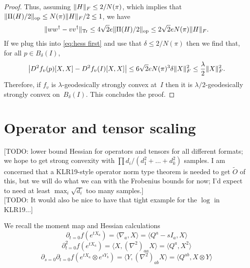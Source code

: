 \documentclass{article}
\DeclareMathOperator{\ope}{op}
\DeclarePairedDelimiter{\abs}{\lvert}{\rvert}
\DeclarePairedDelimiter{\norm}{\lVert}{\rVert}
\newcommand\tr{\operatorname{Tr}}
\newcommand{\TODO}[1]{{\color{blue}[TODO: #1]}}
\begin{document}
\begin{proof}
Thus, assuming $\norm{H}_F \leq 2 / N(\pi)$, which implies that $\norm{\Pi(H)/2}_{\ope} \leq N(\pi) \norm{H}_F / 2 \leq 1$, we have
\begin{align*}
  \norm{ww^\dagger - vv^\dagger}_{\tr}
\leq 4 \sqrt2 e \norm{\Pi(H)/2}_{\ope}
\leq 2 \sqrt2 e N(\pi) \norm{H}_F.
\end{align*}
If we plug this into \cref{eq:hess first} and use that $\delta \leq 2/N(\pi)$ then we find that, for all $p \in B_\delta(I)$,
\begin{align*}
  \abs[\big]{D^2f_v(p)[X,X] - D^2f_v(I)[X,X]}
\leq 6\sqrt{2} e N(\pi)^3 \delta \norm{X}_F^2
\leq \frac\lambda2 \norm{X}_F^2.
\end{align*}
Therefore, if $f_v$ is $\lambda$-geodesically strongly convex at~$I$ then it is $\lambda/2$-geodesically strongly convex on~$B_\delta(I)$.
This concludes the proof.
\end{proof}




\section{Operator and tensor scaling}\label{sec:scaling}
\TODO{lower bound Hessian for operators and tensors for all different formats; we hope to get strong convexity with $\prod d_i /(d_1^2 + \dots + d_k^2)$ samples. I am concerned that a KLR19-style operator norm type theorem is needed to get $\tilde{O}$ of this, but we will do what we can with the Frobenius bounds for now; I'd expect to need at least $\max_i \sqrt{d_i}$ too many samples.}\\
\TODO{It would also be nice to have that tight example for the $\log$ in KLR19...}

We recall the moment map and Hessian calculations
\[ \partial_{t=0} f(e^{tX_{a}}) = \langle \nabla_{a}, X \rangle = \langle Q^{a} - sI_{a}, X \rangle   \]
\[ \partial_{t=0}^{2} f(e^{tX_{a}}) = \langle X, (\nabla^{2})_{aa} X \rangle = \langle Q^{a}, X^{2} \rangle  \]
\[ \partial_{s=0} \partial_{t=0} f(e^{tX_{a}} \otimes e^{sY_{b}}) = \langle Y, (\nabla^{2})_{ab} X \rangle = \langle Q^{ab}, X \otimes Y \rangle   \]
\end{document}
